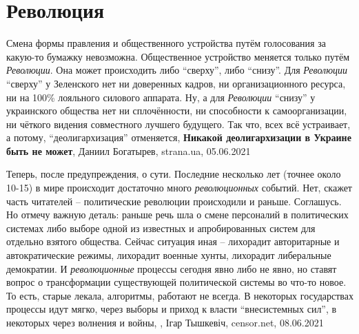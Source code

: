  
 
 
 
 
\chapter{Революция}

Смена формы правления и общественного устройства путём голосования за какую-то
бумажку невозможна. Общественное устройство меняется только путём
\emph{Революции}. Она может происходить либо \enquote{сверху}, либо
\enquote{снизу}. Для \emph{Революции} \enquote{сверху} у Зеленского нет ни
доверенных кадров, ни организационного ресурса, ни на 100\% лояльного силового
аппарата. Ну, а для \emph{Революции} \enquote{снизу} у украинского общества нет
ни сплочённости, ни способности к самоорганизации, ни чёткого видения
совместного лучшего будущего. Так что, всех всё устраивает, а потому,
\enquote{деолигархизация} отменяется,
\textbf{Никакой деолигархизации в Украине быть не может},
Даниил Богатырев, strana.ua, 05.06.2021

Теперь, после предупреждения, о сути.  Последние несколько лет (точнее около
10-15) в мире происходит достаточно много \emph{революционных} событий. Нет, скажет
часть читателей – политические революции происходили и раньше. Соглашусь. Но
отмечу важную деталь: раньше речь шла о смене персоналий в политических
системах либо выборе одной из известных и апробированных систем для отдельно
взятого общества. Сейчас ситуация иная – лихорадит авторитарные и
автократические режимы, лихорадит военные хунты, лихорадит либеральные
демократии.  И \emph{революционные} процессы сегодня явно либо не явно, но ставят
вопрос о трансформации существующей политической системы во что-то новое. То
есть, старые лекала, алгоритмы, работают не всегда. В некоторых государствах
процессы идут мягко, через выборы и приход к власти \enquote{внесистемных сил}, в
некоторых через волнения и войны,
, Ігар Тышкевіч, censor.net, 08.06.2021


